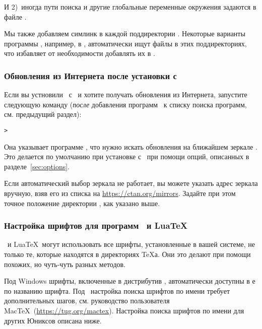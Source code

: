 \documentclass{article}
\begin{document}
И 2)~иногда пути поиска и другие глобальные переменные окружения
задаются в файле .

Мы также добавляем симлинк  в каждой поддиректории
.  Некоторые варианты программы , например, в
\MacOSX, автоматически ищут файлы в этих поддиректориях, что избавляет
от необходимости добавлять их в .

\subsubsection{Обновления из Интернета после установки с  \DVD}
\label{sec:dvd-install-net-updates}

Если вы устновили  \TL\ с \DVD\ и хотите получать обновления из
Интернета, запустите следующую команду (\emph{после} добавления
программ \TL\ к списку поиска программ, см. предыдущий раздел):

\begin{alltt}
> 
\end{alltt}

Она указывает программе , что нужно искать обновления
на ближайшем зеркале \CTAN.  Это делается по умолчанию при установке с
\DVD\ при помощи опций, описанных в разделе~\ref{sec:options}.

Если автоматический выбор зеркала не работает, вы можете указать адрес
зеркала вручную, взяв его из списка на \url{https://ctan.org/mirrors}.
Задайте при этом точное положение директории , как
указано выше.


\subsubsection{Настройка шрифтов для программ \protect\XeTeX\ и Lua\protect\TeX}
\label{sec:font-conf-sys}

\XeTeX\ и Lua\TeX\ могут использовать все шрифты, установленные в
вашей системе, не только те, которые находятся в директориях \TeX а.
Они это делают при помощи похожих, но чуть-чуть разных методов.

Под Windows шрифты, включенные в дистрибутив \TL,
автоматически доступны в \XeTeX е по названию шрифта.  Под \MacOSX\
настройка поиска шрифтов по имени требует дополнительных шагов,
см. руководство пользователя Mac\TeX\ (\url{https://tug.org/mactex}).
Настройка поиска шрифтов по имени для других Юниксов описана ниже. 
\end{document}
